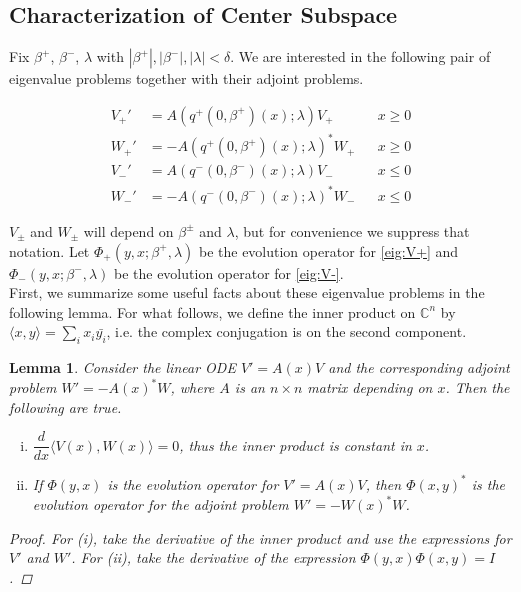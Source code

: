 \documentclass[12pt]{article}
\def\C{{\mathbb C}}
\newtheorem{lemma}{Lemma}
\begin{document}
\subsection{Characterization of Center Subspace}

Fix $\beta^+$, $\beta^-$, $\lambda$ with $|\beta^+|, |\beta^-|, |\lambda| < \delta$. We are interested in the following pair of eigenvalue problems together with their adjoint problems.

\begin{align}
V_+' &= A(q^+(0, \beta^+)(x); \lambda) V_+ && x \geq 0 \label{eig:V+} \\
W_+' &= -A(q^+(0, \beta^+)(x); \lambda)^* W_+ && x \geq 0\label{eig:W+} \\
V_-' &= A(q^-(0, \beta^-)(x); \lambda) V_- && x \leq 0 \label{eig:V-} \\
W_-' &= -A(q^-(0, \beta^-)(x); \lambda)^* W_- && x \leq 0 \label{eig:W-}
\end{align}

$V_\pm$ and $W_\pm$ will depend on $\beta^\pm$ and $\lambda$, but for convenience we suppress that notation. Let $\Phi_+(y, x; \beta^+, \lambda)$ be the evolution operator for \eqref{eig:V+} and $\Phi_-(y, x; \beta^-, \lambda)$ be the evolution operator for \eqref{eig:V-}.\\

First, we summarize some useful facts about these eigenvalue problems in the following lemma. For what follows, we define the inner product on $\C^n$ by $\langle x, y \rangle = \sum_i x_i \bar{y_i}$, i.e. the complex conjugation is on the second component.


\begin{lemma}\label{eigadjoint}
Consider the linear ODE $V' = A(x)V$ and the corresponding adjoint problem $W' = -A(x)^* W$, where $A$ is an $n \times n$ matrix depending on $x$. Then the following are true.
\begin{enumerate}[(i)]
\item $\dfrac{d}{dx}\langle V(x), W(x) \rangle = 0$, thus the inner product is constant in $x$.
\item If $\Phi(y, x)$ is the evolution operator for $V' = A(x)V$, then $\Phi(x, y)^*$ is the evolution operator for the adjoint problem $W' = -W(x)^* W$.
\end{enumerate}
\begin{proof}
For (i), take the derivative of the inner product and use the expressions for $V'$ and $W'$. For (ii), take the derivative of the expression $\Phi(y, x)\Phi(x, y) = I$.
\end{proof}
\end{lemma}
\end{document}
